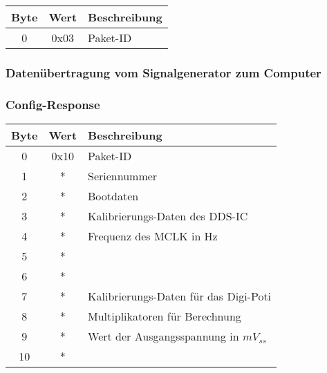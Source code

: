 \begin{flushleft}
\begin{tabular}{c||c|l}
Byte & Wert & Beschreibung \\
\hline
\hline
0 & 0x03 & Paket-ID \\

\end{tabular}
\end{flushleft}


\subsubsection[Signalgenerator $\rightarrow$ Computer]{Datenübertragung vom Signalgenerator zum Computer}

\subsubsection*{Config-Response}

\begin{tabular}{c||c|l}
Byte & Wert & Beschreibung \\
\hline
\hline
0 & 0x10 & Paket-ID \\
\hline
1 & * & Seriennummer \\
\hline
2 & * & Bootdaten \\
\hline
3 & * & Kalibrierungs-Daten des DDS-IC \\
4 & * & Frequenz des MCLK in Hz \\
5 & * &  \\
6 & * &  \\
\hline
7 & * & Kalibrierungs-Daten für das Digi-Poti \\
8 & * & Multiplikatoren für Berechnung \\
\hline
9 & * & Wert der Ausgangsspannung in $mV_{ss}$ \\
10 & * & \\
\end{tabular}
